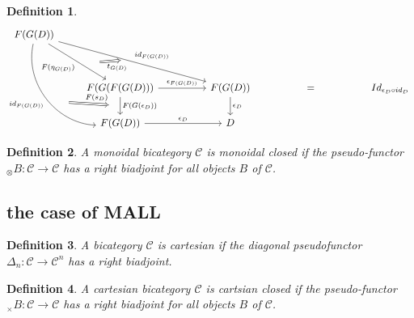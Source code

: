 \documentclass[a4paper, 12pt, twoside,openright]{report}
\newtheorem{definition}{Definition}
\begin{document}
\begin{definition}
$$\begin{tikzcd}
F(G(D))
\arrow[swap,bend right=50]{dddr}{id_{F(G(D))}}[name=A]{}
\arrow[swap]{ddr}{F(\eta_{G(D)})}[name=B]{}
\arrow{ddrrr}{id_{F(G(D))}}[name=C]{}
\\
\\
&
F(G(F(G(D)))
\arrow{rr}{\epsilon_{F(G(D))}}
\arrow{d}{F(G(\epsilon_D))}[name=D]{}
&&
F(G(D))
\arrow{d}{\epsilon_D}
&&
=
&&
Id_{\epsilon_D \circ id_D}
\\
&
F(G(D))
\arrow{rr}{\epsilon_D}
&&
D
\arrow[Rightarrow,shorten >=0.4cm, shorten <=0.8cm,from=A,to=D]{}{F(s_{D})}
\arrow[swap,Rightarrow,shorten >=0.4cm, shorten <=0.8cm,from=B,to=C]{}{t_{G(D)}}
\end{tikzcd}
$$
\end{definition}

\begin{definition}
A monoidal bicategory $\mathcal{C}$ is monoidal closed if the pseudo-functor $_ \otimes B: \mathcal{C} \rightarrow \mathcal{C}$ has a right biadjoint for all objects $B$ of $\mathcal{C}$.
\end{definition}
\subsection{the case of MALL}
\begin{definition}
A bicategory $\mathcal{C}$ is cartesian if the diagonal pseudofunctor $\Delta_n:\mathcal{C} \rightarrow \mathcal{C}^n$ has a right biadjoint. 
\end{definition}
\begin{definition}
A cartesian bicategory $\mathcal{C}$ is cartsian closed if the pseudo-functor $_ \times B: \mathcal{C} \rightarrow \mathcal{C}$ has a right biadjoint for all objects $B$ of $\mathcal{C}$.
\end{definition}
\end{document}
